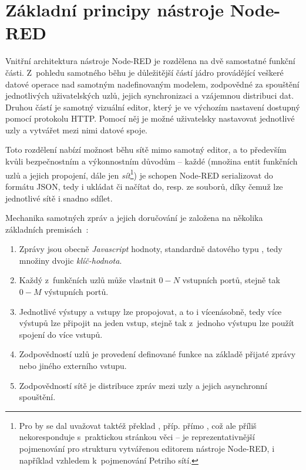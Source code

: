 \section{Základní principy nástroje Node-RED}\label{sec:zakladni-principy-node-red}

Vnitřní architektura nástroje Node-RED je rozdělena na dvě samostatné funkční části.
Z~pohledu samotného běhu je důležitější částí jádro provádějící veškeré datové operace nad samotným nadefinovaným
modelem, zodpovědné za spouštění jednotlivých uživatelských uzlů, jejich synchronizaci a vzájemnou distribuci dat.
Druhou částí je samotný vizuální editor, který je ve výchozím nastavení dostupný pomocí protokolu HTTP. Pomocí něj je
možné uživatelsky nastavovat jednotlivé uzly a vytvářet mezi nimi datové spoje.

Toto rozdělení nabízí možnost běhu sítě mimo samotný editor, a to především kvůli bezpečnostním a
výkonnostním důvodům -- každé  (množina entit funkčních uzlů a jejich propojení, dále jen
\emph{sít}\footnote{Pro  by se dal uvažovat taktéž překlad ,
příp. přímo , což ale příliš nekoresponduje s~praktickou stránkou věci --  je reprezentativnější
pojmenování pro strukturu vytvářenou editorem nástroje Node-RED, i například vzhledem k~pojmenování Petriho sítí.}) je
schopen Node-RED serializovat do formátu JSON, tedy i ukládat či načítat do, resp. ze souborů, díky čemuž lze jednotlivé
sítě i snadno sdílet.

Mechanika samotných zpráv a jejich doručování je založena na několika základních premisách~\cite{NodeRedFlows}:
\begin{enumerate}
    \item Zprávy jsou obecně \emph{Javascript} hodnoty, standardně datového typu ,
    tedy množiny dvojic \emph{klíč-hodnota}.
    \item Každý z~funkčních uzlů může vlastnit $0-N$ vstupních portů, stejně tak $0-M$ výstupních portů.
    \item Jednotlivé výstupy a vstupy lze propojovat, a to i vícenásobně, tedy více výstupů lze připojit na jeden vstup,
    stejně tak z~jednoho výstupu lze použít spojení do více vstupů.
    \item Zodpovědností uzlů je provedení definované funkce na základě přijaté zprávy nebo
    jiného externího vstupu.
    \item Zodpovědností sítě je distribuce zpráv mezi uzly a jejich asynchronní spouštění.
\end{enumerate}

